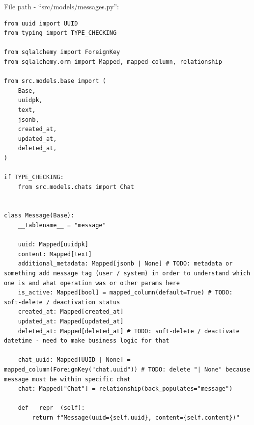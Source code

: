 File path - ``src/models/messages.py'':
\begin{lstlisting}
from uuid import UUID
from typing import TYPE_CHECKING

from sqlalchemy import ForeignKey
from sqlalchemy.orm import Mapped, mapped_column, relationship

from src.models.base import (
    Base,
    uuidpk,
    text,
    jsonb,
    created_at,
    updated_at,
    deleted_at,
)

if TYPE_CHECKING:
    from src.models.chats import Chat


class Message(Base):
    __tablename__ = "message"

    uuid: Mapped[uuidpk]
    content: Mapped[text]
    additional_metadata: Mapped[jsonb | None] # TODO: metadata or something add message tag (user / system) in order to understand which one is and what operation was or other params here
    is_active: Mapped[bool] = mapped_column(default=True) # TODO: soft-delete / deactivation status
    created_at: Mapped[created_at]
    updated_at: Mapped[updated_at]
    deleted_at: Mapped[deleted_at] # TODO: soft-delete / deactivate datetime - need to make business logic for that

    chat_uuid: Mapped[UUID | None] = mapped_column(ForeignKey("chat.uuid")) # TODO: delete "| None" because message must be within specific chat
    chat: Mapped["Chat"] = relationship(back_populates="message")

    def __repr__(self):
        return f"Message(uuid={self.uuid}, content={self.content})"
\end{lstlisting}

\clearpage

